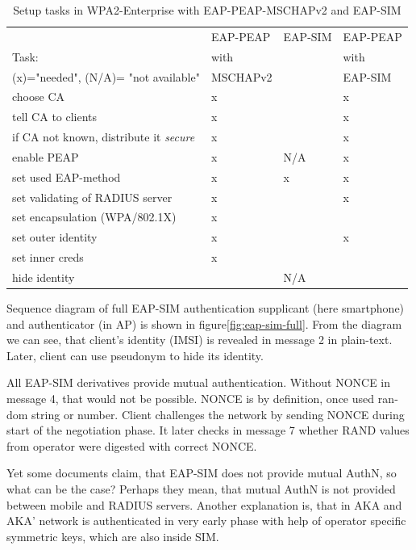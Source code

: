 \documentclass[12pt,a4paper,english]{tutthesis}
\begin{document}
\begin{otherlanguage}{english}
\begin{table}[htb]
\caption{\label{table-peapsim}Setup tasks in  WPA2-Enterprise with EAP-PEAP-MSCHAPv2 and EAP-SIM}
\centering
\begin{tabular}{llll}
 & EAP-PEAP & EAP-SIM & EAP-PEAP\\
Task: & with &  & with\\
(x)="needed", (N/A)= "not available" & MSCHAPv2 &  & EAP-SIM\\
\hline
choose CA & x &  & x\\
tell CA to clients & x &  & x\\
if CA not known, distribute it \emph{secure} & x &  & x\\
enable PEAP & x & N/A & x\\
set used EAP-method & x & x & x\\
set validating of RADIUS server & x &  & x\\
set encapsulation (WPA/802.1X) & x &  & \\
set outer identity & x &  & x\\
set inner creds & x &  & \\
hide identity &  & N/A & \\
\hline
\end{tabular}
\end{table}





Sequence diagram of full EAP-SIM authentication supplicant (here smartphone) and authenticator (in AP) is shown in figure\ref{fig:eap-sim-full}.
From the diagram we can see, that client's identity (IMSI) is
revealed in message 2 in plain-text. Later, client can use pseudonym to
hide its identity.

All EAP-SIM derivatives provide mutual authentication. Without NONCE
in message 4, that would not be possible. NONCE is by definition, once
used random string or number.
 Client challenges the network by
sending NONCE during start of the negotiation phase. It later checks in
message 7 whether RAND values from operator were digested with correct NONCE.

Yet some documents claim, that EAP-SIM does not provide mutual AuthN, so what
can be the case? Perhaps they mean, that mutual AuthN is not provided between
mobile and RADIUS servers. Another explanation is, that in AKA
and AKA' network is authenticated in very early phase with help of operator specific
symmetric keys, which are also inside SIM.






\end{otherlanguage}
\end{document}
